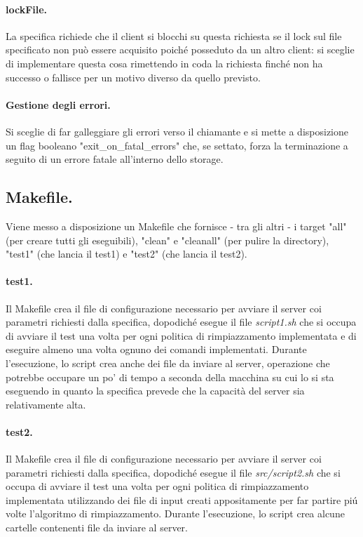 \documentclass[11pt, italian, openany]{book}
\begin{document}
\begin{sloppypar}
\paragraph*{lockFile.}
La specifica richiede che il client si blocchi su questa richiesta se il lock sul file specificato non pu\`o essere acquisito
poich\'e posseduto da un altro client: si sceglie di implementare questa cosa rimettendo in coda la richiesta finch\'e non ha
successo o fallisce per un motivo diverso da quello previsto.

\paragraph*{Gestione degli errori.}
Si sceglie di far galleggiare gli errori verso il chiamante e si mette a disposizione un flag booleano "exit\_on\_fatal\_errors"
che, se settato, forza la terminazione a seguito di un errore fatale all'interno dello storage.

\subsection{Makefile.}
Viene messo a disposizione un Makefile che fornisce - tra gli altri - i target "all" (per creare tutti gli eseguibili),
"clean" e "cleanall" (per pulire la directory), "test1" (che lancia il test1) e "test2" (che lancia il test2).

\paragraph*{test1.}
Il Makefile crea il file di configurazione necessario per avviare il server coi parametri richiesti dalla specifica, dopodich\'e
esegue il file \textit{script1.sh} che si occupa di avviare il test una volta per ogni politica di rimpiazzamento implementata e di
eseguire almeno una volta ognuno dei comandi implementati. Durante l'esecuzione, lo script crea anche dei file da inviare al server,
operazione che potrebbe occupare un po' di tempo a seconda della macchina su cui lo si sta eseguendo in quanto la specifica
prevede che la capacit\`a del server sia relativamente alta.

\paragraph*{test2.}
Il Makefile crea il file di configurazione necessario per avviare il server coi parametri richiesti dalla specifica, dopodich\'e
esegue il file \textit{src/script2.sh} che si occupa di avviare il test una volta per ogni politica di rimpiazzamento implementata
utilizzando dei file di input creati appositamente per far partire pi\'u volte l'algoritmo di rimpiazzamento. Durante l'esecuzione,
lo script crea alcune cartelle contenenti file da inviare al server.


\end{sloppypar}
\end{document}
